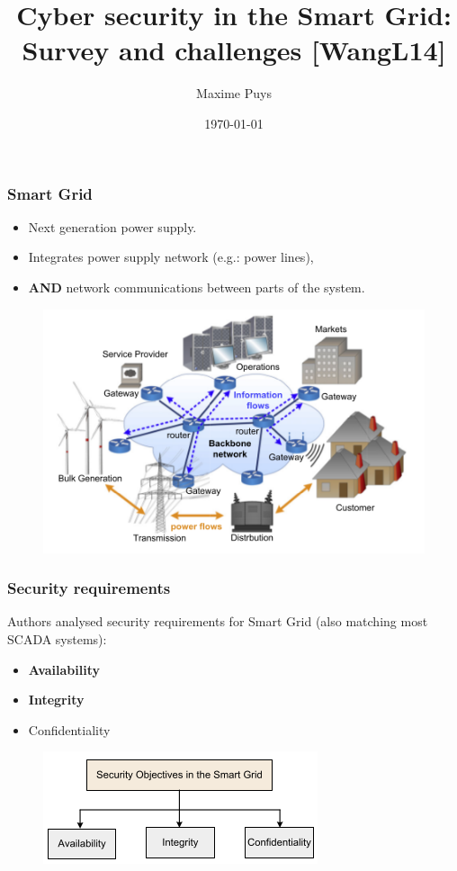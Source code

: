 \documentclass{beamer}
\title{Cyber security in the Smart Grid: Survey and challenges [WangL14]}
\author{Maxime Puys}
\date{\today}
\begin{document}
\begin{frame}
    \maketitle
\end{frame}

\begin{frame}
    \frametitle{Smart Grid}

    \begin{itemize}
        \item Next generation power supply.
            \vfill
        \item Integrates power supply network (e.g.: power lines),
            \vfill
        \item {\bf AND} network communications between parts of the system.
    \end{itemize}
    \vfill
    \begin{figure}[htb]
        \centering
        \includegraphics[scale=.6]{smart-grid}
    \end{figure}
\end{frame}

\begin{frame}
    \frametitle{Security requirements}

    Authors analysed security requirements for Smart Grid (also matching most SCADA systems):
    \vfill
    \begin{itemize}
        \item {\bf Availability}
        \vfill
        \item {\bf Integrity}
        \vfill
        \item Confidentiality
    \end{itemize}
    \vfill
    \begin{figure}[htb]
        \centering
        \includegraphics[scale=.6]{objectives}
    \end{figure}
\end{frame}
\end{document}
